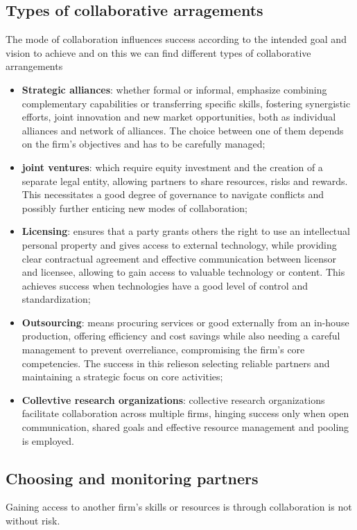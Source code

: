 \documentclass[12pt]{article}
\begin{document}
\subsection{Types of collaborative arragements}
The mode of collaboration influences success according to the intended goal and vision to achieve and on this we can find different types of collaborative arrangements
\begin{itemize}
    \item \textbf{Strategic alliances}: whether formal or informal, emphasize combining complementary capabilities or transferring specific skills, fostering synergistic efforts, joint innovation and new market opportunities, both as individual alliances and network of alliances. The choice between one of them depends on the firm's objectives and has to be carefully managed;
    \item \textbf{joint ventures}:  which require equity investment and the creation of a separate legal entity, allowing partners to share resources, risks and rewards. This necessitates a good degree of governance to navigate conflicts and possibly further enticing new modes of collaboration;
    \item \textbf{Licensing}: ensures that a party grants others the right to use an intellectual personal property and gives access to external technology, while providing clear contractual agreement and effective communication between licensor and licensee, allowing to gain access to valuable technology or content. This achieves success when technologies have a good level of control and standardization;
    \item \textbf{Outsourcing}: means procuring services or good externally from an in-house production, offering efficiency and cost savings while also needing a careful management to prevent overreliance, compromising the firm's core competencies. The success in this relieson selecting reliable partners and maintaining a strategic focus on core activities;
    \item \textbf{Collevtive research organizations}: collective research organizations facilitate collaboration across multiple firms, hinging success only when open communication, shared goals and effective resource management and pooling is employed.
\end{itemize}

\subsection{Choosing and monitoring partners}
Gaining access to another firm's skills or resources is through collaboration is not without risk.
\end{document}

